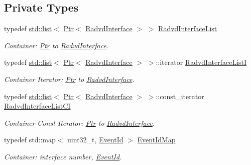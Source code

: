 \subsection*{Private Types}
\begin{DoxyCompactItemize}
\item 
typedef \hyperlink{openflow-interface_8h_afd9bcfa176617760671b67580f536fa7}{std\+::list}$<$ \hyperlink{classns3_1_1Ptr}{Ptr}$<$ \hyperlink{classns3_1_1RadvdInterface}{Radvd\+Interface} $>$ $>$ \hyperlink{classns3_1_1Radvd_a86074d8cb8e7395c05eb5c73046c5adc}{Radvd\+Interface\+List}
\begin{DoxyCompactList}\small\item\em Container\+: \hyperlink{classns3_1_1Ptr}{Ptr} to \hyperlink{classns3_1_1RadvdInterface}{Radvd\+Interface}. \end{DoxyCompactList}\item 
typedef \hyperlink{openflow-interface_8h_afd9bcfa176617760671b67580f536fa7}{std\+::list}$<$ \hyperlink{classns3_1_1Ptr}{Ptr}$<$ \hyperlink{classns3_1_1RadvdInterface}{Radvd\+Interface} $>$ $>$\+::iterator \hyperlink{classns3_1_1Radvd_aa7ed6393ad16abdc7f3a37e18db424c4}{Radvd\+Interface\+ListI}
\begin{DoxyCompactList}\small\item\em Container Iterator\+: \hyperlink{classns3_1_1Ptr}{Ptr} to \hyperlink{classns3_1_1RadvdInterface}{Radvd\+Interface}. \end{DoxyCompactList}\item 
typedef \hyperlink{openflow-interface_8h_afd9bcfa176617760671b67580f536fa7}{std\+::list}$<$ \hyperlink{classns3_1_1Ptr}{Ptr}$<$ \hyperlink{classns3_1_1RadvdInterface}{Radvd\+Interface} $>$ $>$\+::const\+\_\+iterator \hyperlink{classns3_1_1Radvd_ae425a17fa24b2716bd104f81450e158b}{Radvd\+Interface\+List\+CI}
\begin{DoxyCompactList}\small\item\em Container Const Iterator\+: \hyperlink{classns3_1_1Ptr}{Ptr} to \hyperlink{classns3_1_1RadvdInterface}{Radvd\+Interface}. \end{DoxyCompactList}\item 
typedef std\+::map$<$ uint32\+\_\+t, \hyperlink{classns3_1_1EventId}{Event\+Id} $>$ \hyperlink{classns3_1_1Radvd_a0632ec911bbb504e6adfdb0cb39b3d21}{Event\+Id\+Map}
\begin{DoxyCompactList}\small\item\em Container\+: interface number, \hyperlink{classns3_1_1EventId}{Event\+Id}. \end{DoxyCompactList}\item 

\end{DoxyCompactItemize}
